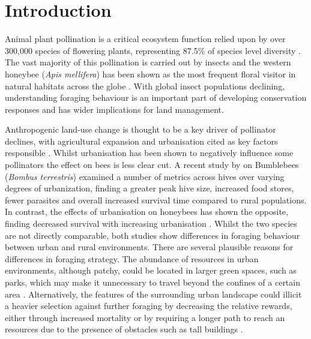 \documentclass[11pt]{article}
\begin{document}
\section{Introduction}	
\begin{linenumbers}
Animal plant pollination is a critical ecosystem function relied upon by over 300,000 species of flowering plants, representing 87.5\% of species level diversity \citep{Ollerton2011}. The vast majority of this pollination is carried out by insects and the western honeybee (\textit{Apis mellifera}) has been shown as the most frequent floral visitor in natural habitats across the globe \citep{Albrecht2018}. With global insect populations declining, understanding foraging behaviour is an important part of developing conservation responses and has wider implications for land management.\par

Anthropogenic land-use change is thought to be a key driver of pollinator declines, with agricultural expansion and urbanisation cited as key factors responsible \citep{Senapathi}. Whilst urbanisation has been shown to negatively influence some pollinators the effect on bees is less clear cut. A recent study by \cite{Samuelson2018} on Bumblebees (\textit{Bombus terrestris}) examined a number of metrics across hives over varying degrees of urbanization, finding a greater peak hive size, increased food stores, fewer parasites and overall increased survival time compared to rural populations. In contrast, the effects of urbanisation on honeybees has shown the opposite, finding decreased survival with increasing urbanisation \citep{Youngsteadt2015}. Whilst the two species are not directly comparable, both studies show differences in foraging behaviour between urban and rural environments. There are several plausible reasons for differences in foraging strategy. The abundance of resources in urban environments, although patchy, could be located in larger green spaces, such as parks, which may make it unnecessary to travel beyond the confines of a certain area \citep{Kaluza2016}. Alternatively, the features of the surrounding urban landscape could illicit a heavier selection against further foraging by decreasing the relative rewards, either through increased mortality or by requiring a longer path to reach an resources due to the presence of obstacles such as tall buildings \citep{Steffan-Dewenter2003}.\par


\end{linenumbers}
\end{document}
